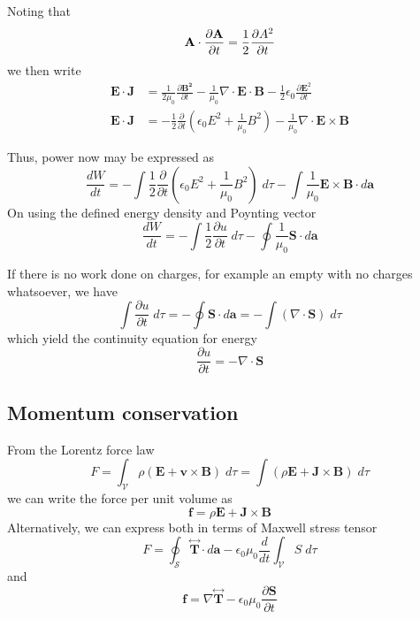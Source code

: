 \documentclass[../../../main.tex]{subfiles}
\begin{document}
Noting that
\begin{equation*}
    \mathbf{A}\cdot\frac{\partial\mathbf{A}}{\partial t}=\frac{1}{2}\frac{\partial A^2}{\partial t}
\end{equation*}
we then write
\begin{align*}
    \mathbf{E}\cdot\mathbf{J} & =\frac{1}{2\mu_0}\frac{\partial \mathbf{B^2}}{\partial t} -\frac{1}{\mu_0}\nabla\cdot\mathbf{E}\cdot\mathbf{B} -\frac{1}{2}\epsilon_0\frac{\partial \mathbf{E}^2}{\partial t} \\
    \mathbf{E}\cdot\mathbf{J} & =-\frac{1}{2}\frac{\partial}{\partial t}\left(\epsilon_0E^2+\frac{1}{\mu_0}B^2\right)-\frac{1}{\mu_0}\nabla\cdot\mathbf{E}\times\mathbf{B}
\end{align*}

Thus, power now may be expressed as
\begin{equation*}
    \frac{dW}{dt}=-\int\frac{1}{2}\frac{\partial}{\partial t}\left(\epsilon_0E^2+\frac{1}{\mu_0}B^2\right)\;d\tau -\int\frac{1}{\mu_0}\mathbf{E}\times\mathbf{B}\cdot d\mathbf{a}
\end{equation*}
On using the defined energy density and Poynting vector
\begin{equation*}
    \frac{dW}{dt}=-\int\frac{1}{2}\frac{\partial u}{\partial t}\;d\tau -\oint\frac{1}{\mu_0}\mathbf{S}\cdot d\mathbf{a}
\end{equation*}

If there is no work done on charges, for example an empty with no charges whatsoever, we have
\begin{equation*}
    \int \frac{\partial u}{\partial t}\;d\tau=-\oint \mathbf{S}\cdot d\mathbf{a}= -\int(\nabla\cdot\mathbf{S})\;d\tau
\end{equation*}
which yield the continuity equation for energy
\begin{equation*}
    \frac{\partial u}{\partial t}=-\nabla\cdot\mathbf{S}
\end{equation*}

\subsection*{Momentum conservation}
From the Lorentz force law
\begin{equation*}
    F=\int_\mathcal{V}\rho(\mathbf{E}+\mathbf{v}\times\mathbf{B})\;d\tau= \int(\rho\mathbf{E}+\mathbf{J}\times\mathbf{B})\;d\tau
\end{equation*}
we can write the force per unit volume as
\begin{equation*}
    \mathbf{f}=\rho\mathbf{E}+\mathbf{J}\times\mathbf{B}
\end{equation*}
Alternatively, we can express both in terms of Maxwell stress tensor
\begin{equation*}
    F=\oint_\mathcal{S}\stackrel{\leftrightarrow}{\mathbf{T}}\cdot d\mathbf{a}-\epsilon_0\mu_0\frac{d}{dt}\int_\mathcal{V}S\;d\tau
\end{equation*}
and
\begin{equation*}
    \mathbf{f}=\nabla\stackrel{\leftrightarrow}{\mathbf{T}}-\epsilon_0\mu_0\frac{\partial \mathbf{S}}{\partial t}
\end{equation*}
\end{document}
